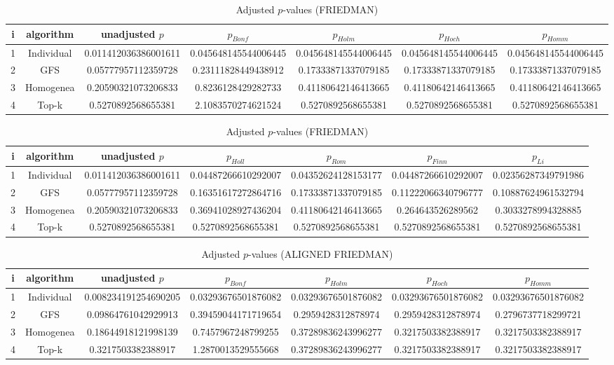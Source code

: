 \documentclass[a4paper,10pt]{article}
\begin{document}
\begin{landscape}
\begin{table}[!htp]
\centering\scriptsize
\caption{Adjusted $p$-values (FRIEDMAN)}
\begin{tabular}{ccccccc}
i&algorithm&unadjusted $p$&$p_{Bonf}$&$p_{Holm}$&$p_{Hoch}$&$p_{Homm}$\\
\hline
1&Individual&0.011412036386001611&0.045648145544006445&0.045648145544006445&0.045648145544006445&0.045648145544006445\\
2&GFS&0.05777957112359728&0.23111828449438912&0.17333871337079185&0.17333871337079185&0.17333871337079185\\
3&Homogenea&0.20590321073206833&0.8236128429282733&0.41180642146413665&0.41180642146413665&0.41180642146413665\\
4&Top-k&0.5270892568655381&2.1083570274621524&0.5270892568655381&0.5270892568655381&0.5270892568655381\\
\hline
\end{tabular}
\end{table}

\begin{table}[!htp]
\centering\scriptsize
\caption{Adjusted $p$-values (FRIEDMAN)}
\begin{tabular}{ccccccc}
i&algorithm&unadjusted $p$&$p_{Holl}$&$p_{Rom}$&$p_{Finn}$&$p_{Li}$\\
\hline
1&Individual&0.011412036386001611&0.04487266610292007&0.04352624128153177&0.04487266610292007&0.02356287349791986\\
2&GFS&0.05777957112359728&0.16351617272864716&0.17333871337079185&0.11222066340796777&0.10887624961532794\\
3&Homogenea&0.20590321073206833&0.36941028927436204&0.41180642146413665&0.264643526289562&0.3033278994328885\\
4&Top-k&0.5270892568655381&0.5270892568655381&0.5270892568655381&0.5270892568655381&0.5270892568655381\\
\hline
\end{tabular}
\end{table}


\newpage

\begin{table}[!htp]
\centering\scriptsize
\caption{Adjusted $p$-values (ALIGNED FRIEDMAN)}
\begin{tabular}{ccccccc}
i&algorithm&unadjusted $p$&$p_{Bonf}$&$p_{Holm}$&$p_{Hoch}$&$p_{Homm}$\\
\hline
1&Individual&0.008234191254690205&0.03293676501876082&0.03293676501876082&0.03293676501876082&0.03293676501876082\\
2&GFS&0.09864761042929913&0.39459044171719654&0.2959428312878974&0.2959428312878974&0.2796737718299721\\
3&Homogenea&0.18644918121998139&0.7457967248799255&0.37289836243996277&0.3217503382388917&0.3217503382388917\\
4&Top-k&0.3217503382388917&1.2870013529555668&0.37289836243996277&0.3217503382388917&0.3217503382388917\\
\hline
\end{tabular}
\end{table}


\end{landscape}
\end{document}
